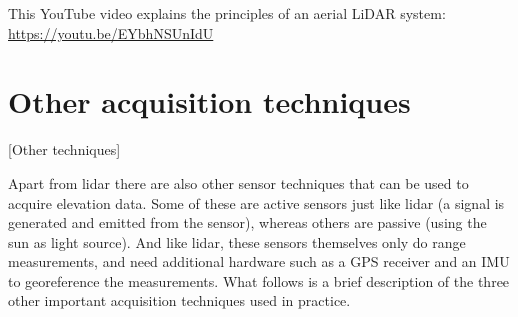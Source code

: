 \begin{floatbox}
	\begin{kaobox-toread}[frametitle=\faExternalLink\ To read or to watch]
		This YouTube video explains the principles of an aerial LiDAR system:
		\\
		\url{https://youtu.be/EYbhNSUnIdU}
	\end{kaobox-toread}
\end{floatbox}



\section{Other acquisition techniques}[Other techniques]%
\label{sec:acquisistion-techniques}

Apart from lidar there are also other sensor techniques that can be used to acquire elevation data. Some of these are  active sensors just like lidar (a signal is generated and emitted from the sensor), whereas others are passive (using the sun as light source). And like lidar, these sensors themselves only do range measurements, and need additional hardware such as a GPS receiver and an IMU to georeference the measurements. What follows is a brief description of the three other important acquisition techniques used in practice. 


